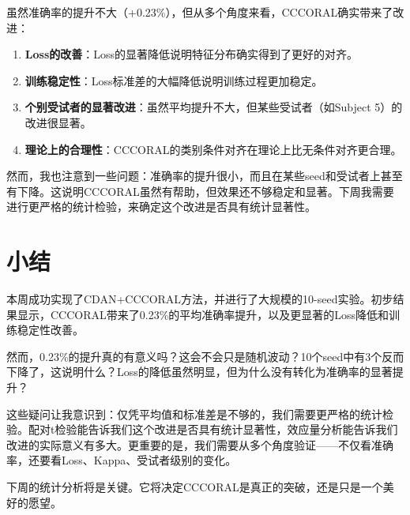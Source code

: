 \documentclass[12pt,a4paper]{ctexart}
\begin{document}
虽然准确率的提升不大（+0.23\%），但从多个角度来看，CCCORAL确实带来了改进：

\begin{enumerate}
    \item \textbf{Loss的改善}：Loss的显著降低说明特征分布确实得到了更好的对齐。
    
    \item \textbf{训练稳定性}：Loss标准差的大幅降低说明训练过程更加稳定。
    
    \item \textbf{个别受试者的显著改进}：虽然平均提升不大，但某些受试者（如Subject 5）的改进很显著。
    
    \item \textbf{理论上的合理性}：CCCORAL的类别条件对齐在理论上比无条件对齐更合理。
\end{enumerate}

然而，我也注意到一些问题：准确率的提升很小，而且在某些seed和受试者上甚至有下降。这说明CCCORAL虽然有帮助，但效果还不够稳定和显著。下周我需要进行更严格的统计检验，来确定这个改进是否具有统计显著性。

\section{小结}

本周成功实现了CDAN+CCCORAL方法，并进行了大规模的10-seed实验。初步结果显示，CCCORAL带来了0.23\%的平均准确率提升，以及更显著的Loss降低和训练稳定性改善。

然而，0.23\%的提升真的有意义吗？这会不会只是随机波动？10个seed中有3个反而下降了，这说明什么？Loss的降低虽然明显，但为什么没有转化为准确率的显著提升？

这些疑问让我意识到：仅凭平均值和标准差是不够的，我们需要更严格的统计检验。配对t检验能告诉我们这个改进是否具有统计显著性，效应量分析能告诉我们改进的实际意义有多大。更重要的是，我们需要从多个角度验证——不仅看准确率，还要看Loss、Kappa、受试者级别的变化。

下周的统计分析将是关键。它将决定CCCORAL是真正的突破，还是只是一个美好的愿望。
\end{document}

